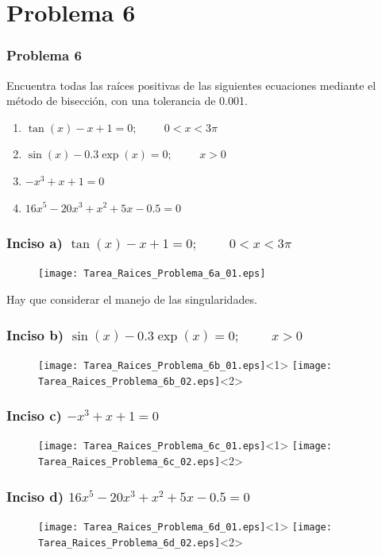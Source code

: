 \section{Problema 6}
\begin{frame}
\frametitle{Problema 6}
Encuentra todas las ra\'{i}ces positivas de las siguientes ecuaciones mediante el m\'{e}todo de bisecci\'{o}n, con una tolerancia de 0.001.
	\begin{enumerate}\label{grupo1}
	\renewcommand{\arraystretch}{1.5}
		\item $\tan(x) - x + 1 = 0; \hspace{1cm} 0 < x < 3\pi$
		\item $\sin(x) - 0.3 \exp(x) = 0; \hspace{1cm} x > 0$
		\item $-x^{3} + x + 1 = 0$
		\item $16x^{5} - 20x^{3} + x^{2} + 5x - 0.5 = 0$
	\end{enumerate}
\end{frame}
\begin{frame}
\frametitle{Inciso a) $\tan(x) - x + 1 = 0; \hspace{1cm} 0 < x < 3\pi$ }
\begin{figure}
	\centering
	\texttt{[image: Tarea\_Raices\_Problema\_6a\_01.eps]}
\end{figure}
Hay que considerar el manejo de las singularidades.
\end{frame}
\begin{frame}[fragile]
\frametitle{Inciso b) $\sin(x) - 0.3 \exp(x) = 0; \hspace{1cm} x > 0$}
\begin{figure}
	\centering
	\texttt{[image: Tarea\_Raices\_Problema\_6b\_01.eps]}<1>
	\texttt{[image: Tarea\_Raices\_Problema\_6b\_02.eps]}<2>
\end{figure}
\end{frame}
\begin{frame}
\frametitle{Inciso c) $-x^{3} + x + 1 = 0$}
\begin{figure}
	\centering
	\texttt{[image: Tarea\_Raices\_Problema\_6c\_01.eps]}<1>
	\texttt{[image: Tarea\_Raices\_Problema\_6c\_02.eps]}<2>
\end{figure}
\end{frame}
\begin{frame}
\frametitle{Inciso d) $16x^{5} - 20x^{3} + x^{2} + 5x - 0.5 = 0$}
\begin{figure}
	\centering
	\texttt{[image: Tarea\_Raices\_Problema\_6d\_01.eps]}<1>
	\texttt{[image: Tarea\_Raices\_Problema\_6d\_02.eps]}<2>
\end{figure}
\end{frame}
